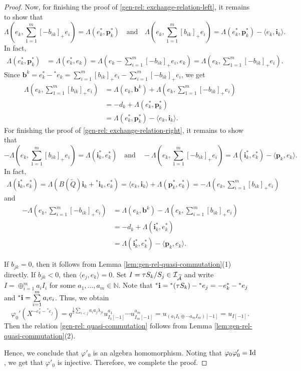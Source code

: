 \documentclass[reqno,12pt]{amsart}
\numberwithin{equation}{section}
\def\lr#1{\langle #1\rangle} \def\fin{\hfill$\square$}  \def\lra{\longrightarrow} \def\mod{\mbox{\rm \textbf{mod}}\,}\def\Mod{\mbox{\rm mod}\,}\def\top{\mbox{\rm top}\,}\def\soc{\mbox{\rm soc}\,}
\theoremstyle{plain} %
\theoremstyle{definition} %
\begin{document}
\begin{proof}
Now, for finishing the proof of \eqref{gen-rel: exchange-relation-left}, it remains to show that
\[
\Lambda(e_k,\sum_{1=1}^m[-b_{ik}]_+e_i)=\Lambda(e_k^\ast,\mathbf{p}_k^\ast)\quad \text{and}\quad \Lambda(e_k,\sum_{1=1}^m[b_{ik}]_+e_i)=\Lambda(e_k^\ast,\mathbf{p}_k^\ast)-\lr{e_k,\mathbf{i}_k}.
\]
In fact,
\begin{align*}
    \Lambda(e_k^\ast, \mathbf{p}_k^\ast)&=\Lambda(e_k^\ast,e_k)
    =\Lambda(e_k-\sum_{i=1}^m[-b_{ik}]_+e_i,e_k)
    =\Lambda(e_k,\sum_{1=1}^m[-b_{ik}]_+e_i).
\end{align*}
Since $\mathbf{b}^k=e_k^\ast-{^\ast e}_k=\sum_{i=1}^m[b_{ik}]_+e_i-\sum_{i=1}^m[-b_{ik}]_+e_i$, we get
\begin{align*}
    \Lambda(e_k,\sum_{1=1}^m[b_{ik}]_+e_i)&=\Lambda(e_k,\mathbf{b}^k)+\Lambda(e_k,\sum_{1=1}^m[-b_{ik}]_+e_i)\\
    &=-d_k+\Lambda(e_k^\ast, \mathbf{p}_k^\ast)\\
    &=\Lambda(e_k^\ast, \mathbf{p}_k^\ast)-\lr{e_k,\mathbf{i}_k}.
\end{align*}
For finishing the proof of \eqref{gen-rel: exchange-relation-right}, it remains to show that
\[
-\Lambda(e_k,\sum_{1=1}^m[b_{ik}]_+e_i)=\Lambda(\mathbf{i}_k^\ast,e_k^\ast)\quad \text{and}\quad -\Lambda(e_k,\sum_{1=1}^m[-b_{ik}]_+e_i)=\Lambda(\mathbf{i}_k^\ast,e_k^\ast)-\lr{\mathbf{p}_k,e_k}.
\]
In fact,
\begin{align*}
\Lambda(\mathbf{i}_k^\ast,e_k^\ast)=\Lambda(B(\widetilde{Q})\mathbf{i}_k+{^\ast\mathbf{i}}_k,e_k^\ast)
    =\lr{e_k,\mathbf{i}_k}+\Lambda(\mathbf{p}_k^\ast,e_k^\ast)
    =-\Lambda(e_k,\sum_{i=1}^m[b_{ik}]_+e_i)
\end{align*}
and
\begin{align*}
    -\Lambda(e_k,\sum_{i=1}^m[-b_{ik}]_+e_i)&=\Lambda(e_k,\mathbf{b}^k)-\Lambda(e_k,\sum_{i=1}^m[b_{ik}]_+e_i)\\
    &=-d_k+\Lambda(\mathbf{i}_k^\ast,e_k^\ast)\\
    &=\Lambda(\mathbf{i}_k^\ast,e_k^\ast)-\lr{\mathbf{p}_k,e_k}.
\end{align*}


If $b_{jk}=0$, then it follows from Lemma \ref{lem:gen-rel-quasi-commutation}(1) directly.
If $b_{jk}<0$, then $\lr{e_j,e_k}=0$. Set $I=\tau S_k/S_j\in\mathcal{I}_{\widetilde{\mathcal{A}}}$ and write $I=\oplus_{i=1}^ma_iI_i$ for some $a_1,\ldots,a_m\in\mathbb{N}$. Note that ${^\ast}{\bf i}={^\ast(\tau S_k)}-{^\ast e_j}=-e_k^\ast-{^\ast e_j}$ and ${^\ast}{\bf i}=\sum\limits_{i=1}^ma_ie_i$. Thus, we obtain
$$\varphi_0'(X^{-e_k^\ast-{^\ast e_j}})=q^{\frac{1}{2}\sum_{i<j}a_ia_j\lambda_{ji}}u_{I_1[-1]}^{a_1}\cdots u_{I_m[-1]}^{a_m}=u_{(a_1I_1\oplus \cdots a_mI_m)[-1]}=u_{I[-1]}.$$
Then the relation \eqref{gen-rel: quasi-commutation} follows from Lemma \ref{lem:gen-rel-quasi-commutation}(2).

Hence, we conclude that $\varphi'_0$ is an algebra homomorphism. Noting that $\varphi_0\varphi'_0={\rm Id}$, we get that $\varphi'_0$ is injective. Therefore, we complete the proof.
\end{proof}
\end{document}
